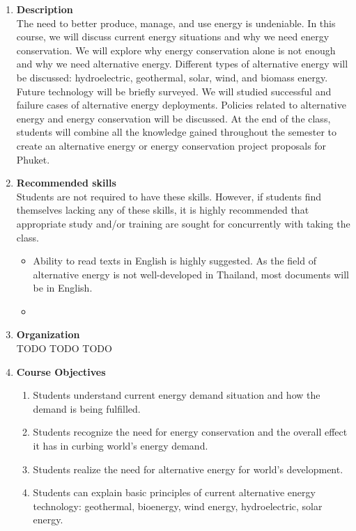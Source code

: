 \documentclass[a4paper,12pt]{article}
\begin{document}
\begin{enumerate}[label=\textbf{\Alph*}]
    \item \textbf{Description} \hfill \\
    The need to better produce, manage, and use energy is undeniable. In this course, we will discuss current energy situations and why we need energy conservation. We will explore why energy conservation alone is not enough and why we need alternative energy. Different types of alternative energy will be discussed: hydroelectric, geothermal, solar, wind, and biomass energy. Future technology will be briefly surveyed. We will studied successful and failure cases of alternative energy deployments. Policies related to alternative energy and energy conservation will be discussed. At the end of the class, students will combine all the knowledge gained throughout the semester to create an alternative energy or energy conservation project proposals for Phuket.
    \item \textbf{Recommended skills} \hfill \\
        Students are not required to have these skills. However, if students find themselves lacking any of these skills, it is highly recommended that appropriate study and/or training are sought for concurrently with taking the class.
        \begin{itemize}
            \item Ability to read texts in English is highly suggested. As the field of alternative energy is not well-developed in Thailand, most documents will be in English. 
            \item 
        \end{itemize}
    \item \textbf{Organization} \hfill \\
    TODO TODO TODO
    \item \textbf{Course Objectives} \hfill \\
    \begin{enumerate}[label=\arabic*.]
        \item Students understand current energy demand situation and how the demand is being fulfilled.
        \item Students recognize the need for energy conservation and the overall effect it has in curbing world's energy demand.
        \item Students realize the need for alternative energy for world's development.
        \item Students can explain basic principles of current alternative energy technology: geothermal, bioenergy, wind energy, hydroelectric, solar energy. 

\end{enumerate}
\end{enumerate}
\end{document}
